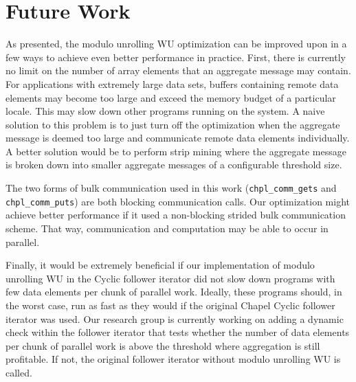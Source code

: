 \section{Future Work}\label{sec:future_work}

As presented, the modulo unrolling WU optimization can be improved upon in a few ways to achieve even better performance in practice. First, there is currently no limit on the number of array elements that an aggregate message may contain. For applications with extremely large data sets, buffers containing remote data elements may become too large and exceed the memory budget of a particular locale. This may slow down other programs running on the system. A naive solution to this problem is to just turn off the optimization when the aggregate message is deemed too large and communicate remote data elements individually. A better solution would be to perform strip mining where the aggregate message is broken down into smaller aggregate messages of a configurable threshold size. 

The two forms of bulk communication used in this work (\texttt{chpl\_comm\_gets} and \texttt{chpl\_comm\_puts}) are both blocking communication calls. Our optimization might achieve better performance if it used a non-blocking strided bulk communication scheme. That way, communication and computation may be able to occur in parallel. 

Finally, it would be extremely beneficial if our implementation of modulo unrolling WU in the Cyclic follower iterator did not slow down programs with few data elements per chunk of parallel work. Ideally, these programs should, in the worst case, run as fast as they would if the original Chapel Cyclic follower iterator was used. Our research group is currently working on adding a dynamic check within the follower iterator that tests whether the number of data elements per chunk of parallel work is above the threshold where aggregation is still profitable. If not, the original follower iterator without modulo unrolling WU is called. 

